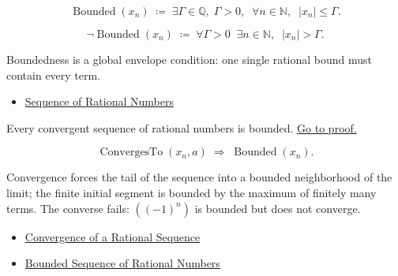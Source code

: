 \begin{remark*}
\[
\operatorname{Bounded}(x_n)
\;\coloneqq\;
\exists \Gamma \in \mathbb{Q},\; \Gamma > 0,\;\;
\forall n \in \mathbb{N},\;\; |x_n| \leq \Gamma.
\]
\end{remark*}

\begin{remark*}
\[
\neg\operatorname{Bounded}(x_n)
\;\coloneqq\;
\forall \Gamma > 0 \;\; \exists n \in \mathbb{N},\;\; |x_n| > \Gamma.
\]
\end{remark*}

\begin{remark*}[Interpretation]
Boundedness is a global envelope condition: one single rational bound must
contain every term.
\end{remark*}

\begin{remark*}[Dependencies]
\begin{itemize}
  \item \hyperref[def:rational-sequence]{Sequence of Rational Numbers}
\end{itemize}
\end{remark*}

\begin{theorem}
\label{thm:convergent-bounded-q}
Every convergent sequence of rational numbers is bounded.
\hyperref[prf:convergent-bounded-q]{Go to proof.}
\end{theorem}

\begin{remark*}
\[
\operatorname{ConvergesTo}(x_n, a)
\;\Longrightarrow\;
\operatorname{Bounded}(x_n).
\]
\end{remark*}

\begin{remark*}[Interpretation]
Convergence forces the tail of the sequence into a bounded neighborhood of
the limit; the finite initial segment is bounded by the maximum of finitely
many terms. The converse fails: $((-1)^n)$ is bounded but does not converge.
\end{remark*}

\begin{remark*}[Dependencies]
\begin{itemize}
  \item \hyperref[def:convergent-rational-sequence]{Convergence of a Rational Sequence}
  \item \hyperref[def:bounded-sequence-q]{Bounded Sequence of Rational Numbers}
\end{itemize}
\end{remark*}

